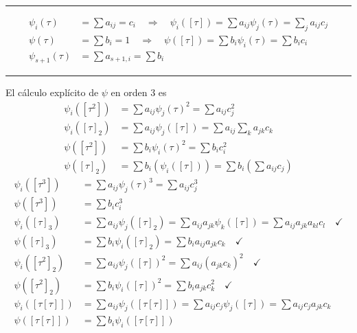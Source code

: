 \noindent\rule{\linewidth}{0.4pt}

\begin{align*}
    \psi_i(\tau) &= \sum a_{ij} = c_i \quad \Rightarrow \quad \psi_i([\tau]) = \sum a_{ij} \psi_j(\tau) = \sum_{j} a_{ij} c_j \\
    \psi(\tau) &= \sum b_i = 1 \quad \Rightarrow \quad \psi([\tau]) = \sum b_i \psi_i(\tau) = \sum b_i c_i \\
    \psi_{s+1}(\tau) &= \sum a_{s+1, i} = \sum b_i
\end{align*}

\noindent\rule{\linewidth}{0.4pt}
El c\'alculo expl\'icito de $\psi$ en orden 3 es
\begin{align*}
    \psi_i([\tau^2]) &= \sum a_{ij} \psi_j(\tau)^2 = \sum a_{ij} c_j^2 \\
    \psi_i([\tau]_2) &= \sum a_{ij} \psi_j([\tau]) = \sum a_{ij} \sum_{k} a_{jk} c_k \\
    \psi([\tau^2]) &= \sum b_i \psi_i(\tau)^2 = \sum b_i c_i^2 \\
    \psi([\tau]_2) &= \sum b_i \left(\psi_i([\tau])\right) = \sum b_i \left(\sum a_{ij} c_j\right)
\end{align*}
\begin{align*}
    \psi_i([\tau^3]) &= \sum a_{ij} \psi_j(\tau)^3 = \sum a_{ij} c_j^3 \\
    \psi([\tau^3]) &= \sum b_i c_i^3 \\[0.5em]
    \psi_i([\tau]_3) &= \sum a_{ij} \psi_j([\tau]_2) = \sum a_{ij} a_{jk} \psi_k([\tau]) = \sum a_{ij} a_{jk} a_{kl} c_l \quad \checkmark \\
    \psi([\tau]_3) &= \sum b_i \psi_i([\tau]_2) = \sum b_i a_{ij} a_{jk} c_k \quad \checkmark \\[0.5em]
    \psi_i([\tau^2]_2) &= \sum a_{ij} \psi_j([\tau])^2 = \sum a_{ij} \left(a_{jk} c_k\right)^2 \quad \checkmark \\
    \psi([\tau^2]_2) &= \sum b_i \psi_i([\tau])^2 = \sum b_i a_{jk} c_k^2 \quad \checkmark \\[0.5em]
    \psi_i([\tau[\tau]]) &= \sum a_{ij} \psi_j([\tau[\tau]]) = \sum a_{ij} c_j \psi_j([\tau]) = \sum a_{ij} c_j a_{jk} c_k \\
    \psi([\tau[\tau]]) &= \sum b_i \psi_i([\tau[\tau]])
\end{align*}

